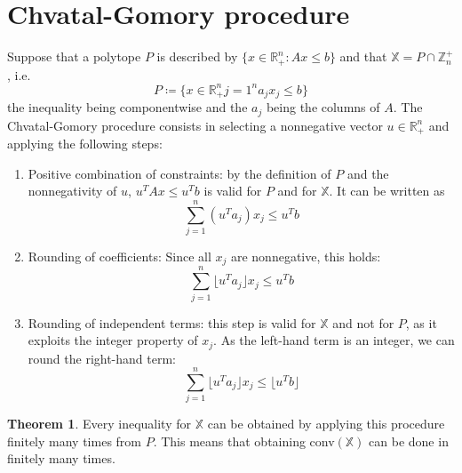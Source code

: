 \documentclass[11pt, openany]{report}
\newcommand{\R}{\mathbb{R}}
\theoremstyle{definition}
\newtheorem{thm}{Theorem}[chapter]
\begin{document}
\section{Chvatal-Gomory procedure}
Suppose that a polytope $P$ is described by $\{x\in \R_+^n:Ax\le b\}$ and that $\mathbb{X}=P\cap \mathbb{Z}_n^+$, i.e.
\begin{equation}
    P\coloneqq \{x\in \R^n_+{j=1}^n a_jx_j\le b\}
\end{equation}
the inequality being componentwise and the $a_j$ being the columns of $A$. The Chvatal-Gomory procedure consists in selecting a nonnegative vector $u\in \R_+^n$ and applying the following steps:
\begin{enumerate}
    \item Positive combination of constraints: by the definition of $P$ and the nonnegativity of $u$, $u^TAx\le u^Tb$ is valid for $P$ and for $\mathbb{X}$. It can be written as 
    \begin{equation}
        \sum_{j=1}^n (u^Ta_j)x_j\le u^Tb
    \end{equation}
    \item Rounding of coefficients: Since all $x_j$ are nonnegative, this holds:
    \begin{equation}
        \sum_{j=1}^n \lfloor u^Ta_j\rfloor x_j \le u^Tb
    \end{equation}
    \item Rounding of independent terms: this step is valid for $\mathbb{X}$ and not for $P$, as it exploits the integer property of $x_j$. As the left-hand term is an integer, we can round the right-hand term:
    \begin{equation}
        \sum_{j=1}^n \lfloor u^Ta_j\rfloor x_j \le \lfloor u^Tb\rfloor 
    \end{equation}
\end{enumerate}
\begin{thm}
    Every inequality for $\mathbb{X}$ can be obtained by applying this procedure finitely many times from $P$. This means that obtaining conv$(\mathbb{X})$ can be done in finitely many times. 
\end{thm}
\end{document}
